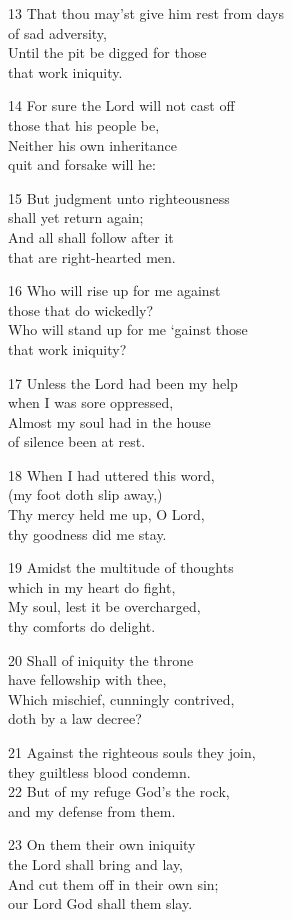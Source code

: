 13 That thou may’st give him rest from days\\
of sad adversity,\\
Until the pit be digged for those\\
that work iniquity.

14 For sure the Lord will not cast off\\
those that his people be,\\
Neither his own inheritance\\
quit and forsake will he:

15 But judgment unto righteousness\\
shall yet return again;\\
And all shall follow after it\\
that are right-hearted men.

16 Who will rise up for me against\\
those that do wickedly?\\
Who will stand up for me ‘gainst those\\
that work iniquity?

17 Unless the Lord had been my help\\
when I was sore oppressed,\\
Almost my soul had in the house\\
of silence been at rest.

18 When I had uttered this word,\\
(my foot doth slip away,)\\
Thy mercy held me up, O Lord,\\
thy goodness did me stay.

19 Amidst the multitude of thoughts\\
which in my heart do fight,\\
My soul, lest it be overcharged,\\
thy comforts do delight.

20 Shall of iniquity the throne\\
have fellowship with thee,\\
Which mischief, cunningly contrived,\\
doth by a law decree?

21 Against the righteous souls they join,\\
they guiltless blood condemn.\\
22 But of my refuge God’s the rock,\\
and my defense from them.

23 On them their own iniquity\\
the Lord shall bring and lay,\\
And cut them off in their own sin;\\
our Lord God shall them slay.

